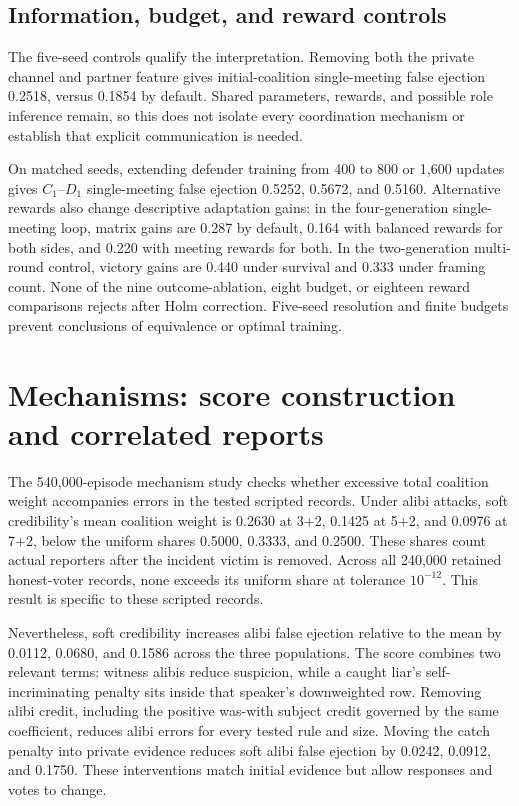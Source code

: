 \documentclass[
  12pt,
]{article}
\begin{document}
\FloatBarrier

\subsection{Information, budget, and reward
controls}\label{information-budget-and-reward-controls}

The five-seed controls qualify the interpretation. Removing both the
private channel and partner feature gives initial-coalition
single-meeting false ejection 0.2518, versus 0.1854 by default. Shared
parameters, rewards, and possible role inference remain, so this does
not isolate every coordination mechanism or establish that explicit
communication is needed.

On matched seeds, extending defender training from 400 to 800 or 1,600
updates gives \(C_1\)--\(D_1\) single-meeting false ejection 0.5252,
0.5672, and 0.5160. Alternative rewards also change descriptive
adaptation gains: in the four-generation single-meeting loop, matrix
gains are 0.287 by default, 0.164 with balanced rewards for both sides,
and 0.220 with meeting rewards for both. In the two-generation
multi-round control, victory gains are 0.440 under survival and 0.333
under framing count. None of the nine outcome-ablation, eight budget, or
eighteen reward comparisons rejects after Holm correction. Five-seed
resolution and finite budgets prevent conclusions of equivalence or
optimal training.

\FloatBarrier

\section{Mechanisms: score construction and correlated
reports}\label{mechanisms-score-construction-and-correlated-reports}

The 540,000-episode mechanism study checks whether excessive total
coalition weight accompanies errors in the tested scripted records.
Under alibi attacks, soft credibility's mean coalition weight is 0.2630
at 3+2, 0.1425 at 5+2, and 0.0976 at 7+2, below the uniform shares
0.5000, 0.3333, and 0.2500. These shares count actual reporters after
the incident victim is removed. Across all 240,000 retained honest-voter
records, none exceeds its uniform share at tolerance \(10^{-12}\). This
result is specific to these scripted records.

Nevertheless, soft credibility increases alibi false ejection relative
to the mean by 0.0112, 0.0680, and 0.1586 across the three populations.
The score combines two relevant terms: witness alibis reduce suspicion,
while a caught liar's self-incriminating penalty sits inside that
speaker's downweighted row. Removing alibi credit, including the
positive was-with subject credit governed by the same coefficient,
reduces alibi errors for every tested rule and size. Moving the catch
penalty into private evidence reduces soft alibi false ejection by
0.0242, 0.0912, and 0.1750. These interventions match initial evidence
but allow responses and votes to change.
\end{document}
